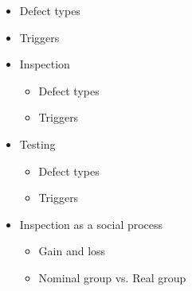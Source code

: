 		\begin{itemize}
			\item Defect types
			\item Triggers
			\item Inspection
				\begin{itemize}
					\item Defect types
					\item Triggers
				\end{itemize}
			\item Testing
				\begin{itemize}
					\item Defect types
					\item Triggers
				\end{itemize}
			\item Inspection as a social process
				\begin{itemize}
					\item Gain and loss
					\item Nominal group vs. Real group
				\end{itemize}
		\end{itemize}


